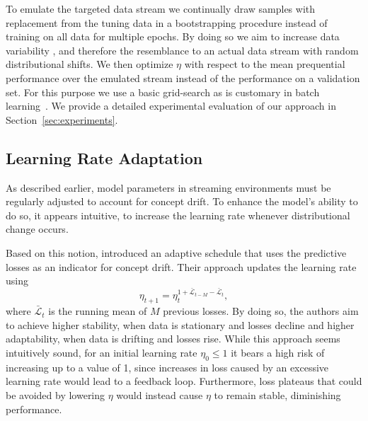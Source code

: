 \documentclass[letterpaper]{article} %
\begin{document}
To emulate
the targeted data stream we continually draw samples with replacement from the tuning data in a bootstrapping procedure instead of training on all data for multiple epochs.
By doing so we aim to increase data variability%
, and therefore the resemblance to an actual data stream with random distributional shifts.
We then optimize $\eta$ with respect to the mean prequential performance over the emulated stream instead of the performance on a validation set.
For this purpose we use a basic grid-search as is customary in batch learning~\cite{defazioLearningRateFreeLearningDAdaptation2023a}.
We provide a detailed experimental evaluation of our approach in Section~\ref{sec:experiments}.

\subsection{Learning Rate Adaptation}


As described earlier, model parameters in streaming environments must be regularly adjusted to account for concept drift.
To enhance the model's ability to do so, it appears intuitive, to increase the learning rate whenever distributional change occurs.

Based on this notion, \citet{kunchevaAdaptiveLearningRate2008} introduced an adaptive schedule that uses the predictive losses as an indicator for concept drift.
Their approach updates the learning rate using
\begin{equation}
	\eta_{t+1} = \eta_t^{1+	\bar{\mathcal{L}}_{t-M} - \bar{\mathcal{L}}_{t}},
\end{equation}\label{eq:kuncheva_lr}
where $\bar{\mathcal{L}}_{t}$ is the running mean of $M$ previous losses.
By doing so, the authors aim to achieve higher stability, when data is stationary and losses decline and higher adaptability, when data is drifting and losses rise.
While this approach seems intuitively sound, for an initial learning rate $\eta_0 \leq 1$ it bears a high risk of increasing up to a value of 1, since increases in loss caused by an excessive learning rate would lead to a feedback loop.
Furthermore, loss plateaus that could be avoided by lowering $\eta$ would instead cause $\eta$ to remain stable, diminishing performance.
\end{document}
